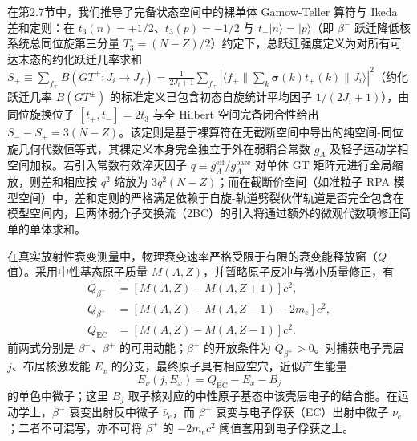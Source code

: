 在第2.7节中，我们推导了完备状态空间中的裸单体 Gamow-Teller 算符与 Ikeda 差和定则：在 $t_3(n) = +1/2$、$t_3(p) = -1/2$ 与 $t_- |n\rangle = |p\rangle$（即 $\beta^-$ 跃迁降低核系统总同位旋第三分量 $T_3 = (N - Z)/2$）约定下，总跃迁强度定义为对所有可达末态的约化跃迁几率求和 $S_\mp \equiv \sum_{f_\mp} B(GT^\mp; J_i \to J_f) = \frac{1}{2J_i + 1} \sum_{f_\mp} |\langle f_\mp \| \sum_k \boldsymbol{\sigma}(k) t_\mp(k) \| J_i \rangle|^2$（约化跃迁几率 $B(GT^\pm)$ 的标准定义已包含初态自旋统计平均因子 $1/(2J_i + 1)$），由同位旋换位子 $[t_+, t_-] = 2 t_3$ 与全 Hilbert 空间完备闭合性给出 $S_- - S_+ = 3(N - Z)$。该定则是基于裸算符在无截断空间中导出的纯空间-同位旋几何代数恒等式，其裸定义本身完全独立于外在弱耦合常数 $g_A$ 及轻子运动学相空间加权。若引入常数有效淬灭因子 $q \equiv g_A^{\mathrm{eff}} / g_A^{\mathrm{bare}}$ 对单体 GT 矩阵元进行全局缩放，则差和相应按 $q^2$ 缩放为 $3 q^2 (N - Z)$；而在截断价空间（如准粒子 RPA 模型空间）中，差和定则的严格满足依赖于自旋-轨道劈裂伙伴轨道是否完全包含在模型空间内，且两体弱介子交换流（2BC）的引入将通过额外的微观代数项修正简单的单体求和。

在真实放射性衰变测量中，物理衰变速率严格受限于有限的衰变能释放窗（$Q$ 值）。采用中性基态原子质量 $M(A,Z)$，并暂略原子反冲与微小质量修正，有
\begin{align}
Q_{\beta^-}&=[M(A,Z)-M(A,Z+1)]c^2,\label{eq:4-7-Q-betaminus}\\
Q_{\beta^+}&=[M(A,Z)-M(A,Z-1)-2m_e]c^2,\label{eq:4-7-Q-betaplus}\\
Q_{\mathrm{EC}}&=[M(A,Z)-M(A,Z-1)]c^2.\label{eq:4-7-Q-EC}
\end{align}
前两式分别是 $\beta^-$、$\beta^+$ 的可用动能；$\beta^+$ 的开放条件为 $Q_{\beta^+}>0$。对捕获电子壳层 $j$、布居核激发能 $E_x$ 的分支，最终原子具有相应空穴，近似产生能量
\begin{equation}\label{eq:4-7-Q-EC-neutrino}
E_\nu(j,E_x)=Q_{\mathrm{EC}}-E_x-B_j
\end{equation}
的单色中微子；这里 $B_j$ 取子核对应的中性原子基态中该壳层电子的结合能。在运动学上，$\beta^-$ 衰变出射反中微子 $\bar{\nu}_e$，而 $\beta^+$ 衰变与电子俘获（EC）出射中微子 $\nu_e$；二者不可混写，亦不可将 $\beta^+$ 的 $-2m_e c^2$ 阈值套用到电子俘获之上。

